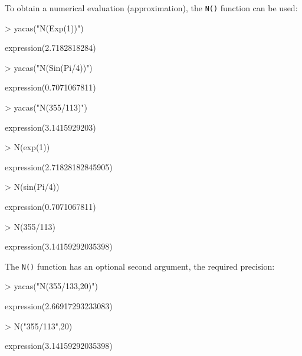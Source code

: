 \documentclass[]{article}
\newcommand{\code}[1]{{\tt #1}}
\begin{document}
 To obtain a numerical evaluation
(approximation), the \code{N()} function can be used:
\begin{Schunk}
\begin{Sinput}
> yacas("N(Exp(1))")
\end{Sinput}
\begin{Soutput}
expression(2.7182818284)
\end{Soutput}
\begin{Sinput}
> yacas("N(Sin(Pi/4))")
\end{Sinput}
\begin{Soutput}
expression(0.7071067811)
\end{Soutput}
\begin{Sinput}
> yacas("N(355/113)")
\end{Sinput}
\begin{Soutput}
expression(3.1415929203)
\end{Soutput}
\end{Schunk}

\begin{Schunk}
\begin{Sinput}
> N(exp(1))
\end{Sinput}
\begin{Soutput}
expression(2.71828182845905)
\end{Soutput}
\begin{Sinput}
> N(sin(Pi/4))
\end{Sinput}
\begin{Soutput}
expression(0.7071067811)
\end{Soutput}
\begin{Sinput}
> N(355/113)
\end{Sinput}
\begin{Soutput}
expression(3.14159292035398)
\end{Soutput}
\end{Schunk}

The \code{N()} function has an optional second argument, the required precision:
\begin{Schunk}
\begin{Sinput}
> yacas("N(355/133,20)")
\end{Sinput}
\begin{Soutput}
expression(2.66917293233083)
\end{Soutput}
\end{Schunk}

\begin{Schunk}
\begin{Sinput}
> N("355/113",20) 
\end{Sinput}
\begin{Soutput}
expression(3.14159292035398)
\end{Soutput}
\end{Schunk}
\end{document}
